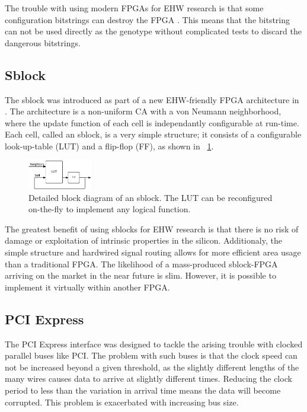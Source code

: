 The trouble with using modern FPGAs for EHW research is that some configuration bitstrings can destroy the FPGA \cite{ug380} \cite{xapp151}.
This means that the bitstring can not be used directly as the genotype without complicated tests to discard the dangerous bitstrings.

\subsection{Sblock}

The sblock was introduced as part of a new EHW-friendly FPGA architecture in \cite{haddow2000sblock}.
The architecture is a non-uniform CA with a von Neumann neighborhood, where the update function of each cell is independantly configurable at run-time.
Each cell, called an sblock, is a very simple structure; it consists of a configurable look-up-table (LUT) and a flip-flop (FF), as shown in \figurename~\ref{fig:sblock}.

\begin{figure}[!ht]
    \centering
    \includegraphics[width=0.25\textwidth]{figures/sblock}
    \caption{Detailed block diagram of an sblock. The LUT can be reconfigured on-the-fly to implement any logical function.}
    \label{fig:sblock}
\end{figure}

The greatest benefit of using sblocks for EHW research is that there is no risk of damage or exploitation of intrinsic properties in the silicon.
Additionaly, the simple structure and hardwired signal routing allows for more efficient area usage than a traditional FPGA.
The likelihood of a mass-produced sblock-FPGA arriving on the market in the near future is slim.
However, it is possible to implement it virtually within another FPGA.

\subsection{PCI Express}

The PCI Express interface was designed to tackle the arising trouble with clocked parallel buses like PCI.
The problem with such buses is that the clock speed can not be increased beyond a given threshold, as the slightly different lengths of the many wires causes data to arrive at slightly different times.
Reducing the clock period to less than the variation in arrival time means the data will become corrupted.
This problem is exacerbated with increasing bus size.

